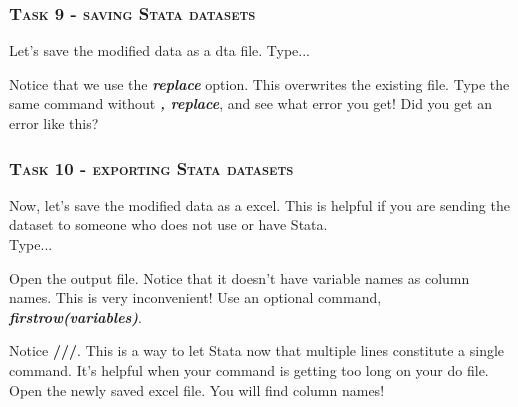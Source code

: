 \documentclass[10pt]{beamer}
\begin{document}
	\begin{frame}
		\frametitle{\textsc{Task 9 - saving Stata datasets}}		
		 Let's save the modified data as a dta file.
					\vspace{2mm} Type...
\begin{stlog}\end{stlog}
		\vspace{2mm}
		 Notice that we use the \textbf{\textit{replace}} option. 
					 This overwrites the existing file. 
					 \vspace{2mm} Type the same command without \textbf{\textit{, replace}}, 
					 and see what error you get! 
		\vspace{2mm}			 
		\onslide<3-> Did you get an error like this? 
		\begin{center}			
		\end{center}
	\end{frame}
	
	\begin{frame}
		\frametitle{\textsc{Task 10 - exporting Stata datasets}}
			
		 Now, let's save the modified data as a excel. 
					 This is helpful if you are sending the dataset to 
					 someone who does not use or have Stata. \\
					 Type...
		\vspace{2mm}
\begin{stlog}\end{stlog}
		\vspace{2mm}
		 Open the output file. 
					 Notice that it doesn't have variable names as column names.
					 This is very inconvenient!
		\onslide<3-> Use an optional command, \textbf{\textit{firstrow(variables)}}.
		\vspace{2mm}
\begin{stlog}\end{stlog}
		\vspace{2mm}
		 Notice \textbf{///}. This is a way to let Stata now 
					  that multiple lines constitute a single command. 
					  It's helpful when your command is getting too
					  long on your do file. Open the newly saved excel file. 
					  You will find column names!
	\end{frame}
		
\end{document}
